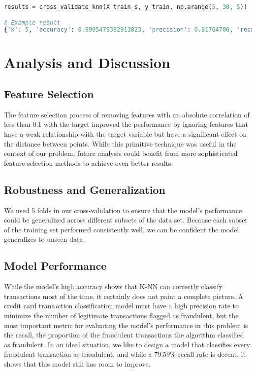 \documentclass{article}
\begin{document}
\begin{lstlisting}[language=Python, caption=Model Evaluation]
results = cross_validate_knn(X_train_s, y_train, np.arange(5, 30, 5))

# Example result
{'k': 5, 'accuracy': 0.9995479382913823, 'precision': 0.91764706, 'recall': 0.79591837}
\end{lstlisting}

\section{Analysis and Discussion}

\subsection{Feature Selection}

The feature selection process of removing features with an absolute correlation of less than 0.1 with the target improved the performance by ignoring features that have a weak relationship with the target variable but have a significant effect on the distance between points. While this primitive technique was useful in the context of our problem, future analysis could benefit from more sophisticated feature selection methods to achieve even better results.

\subsection{Robustness and Generalization}

We used 5 folds in our cross-validation to ensure that the model's performance could be generalized across different subsets of the data set. Because each subset of the training set performed consistently well, we can be confident the model generalizes to unseen data.

\subsection{Model Performance}

While the model's high accuracy shows that K-NN can correctly classify transactions most of the time, it certainly does not paint a complete picture. A credit card transaction classification model must have a high precision rate to minimize the number of legitimate transactions flagged as fraudulent, but the most important metric for evaluating the model's performance in this problem is the recall, the proportion of the fraudulent transactions the algorithm classified as fraudulent. In an ideal situation, we like to design a model that classifies every fraudulent transaction as fraudulent, and while a 79.59\% recall rate is decent, it shows that this model still has room to improve.
\end{document}
